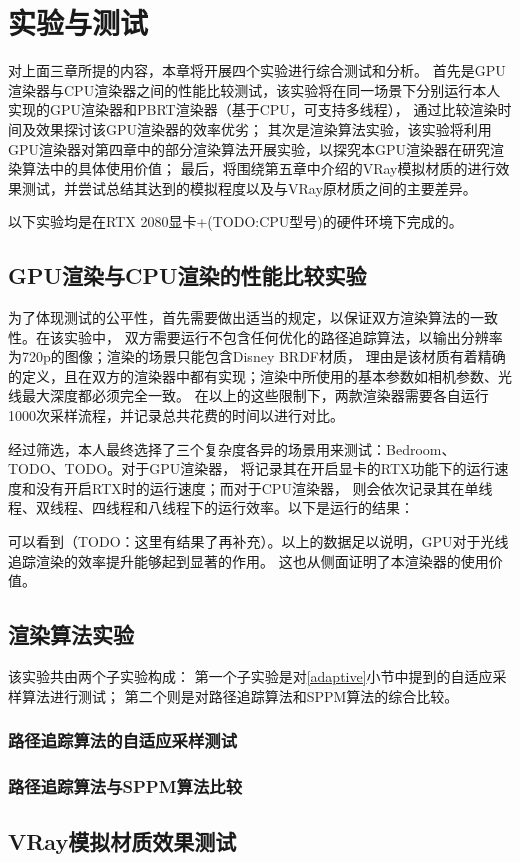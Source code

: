 \chapter{实验与测试}
\label{cha:evaluations}

对上面三章所提的内容，本章将开展四个实验进行综合测试和分析。
首先是GPU渲染器与CPU渲染器之间的性能比较测试，该实验将在同一场景下分别运行本人实现的GPU渲染器和PBRT渲染器（基于CPU，可支持多线程），
通过比较渲染时间及效果探讨该GPU渲染器的效率优劣；
其次是渲染算法实验，该实验将利用GPU渲染器对第四章中的部分渲染算法开展实验，以探究本GPU渲染器在研究渲染算法中的具体使用价值；
最后，将围绕第五章中介绍的VRay模拟材质的进行效果测试，并尝试总结其达到的模拟程度以及与VRay原材质之间的主要差异。

以下实验均是在RTX 2080显卡+(TODO:CPU型号)的硬件环境下完成的。

\section{GPU渲染与CPU渲染的性能比较实验}

为了体现测试的公平性，首先需要做出适当的规定，以保证双方渲染算法的一致性。在该实验中，
双方需要运行不包含任何优化的路径追踪算法，以输出分辨率为720p的图像；渲染的场景只能包含Disney BRDF材质，
理由是该材质有着精确的定义，且在双方的渲染器中都有实现；渲染中所使用的基本参数如相机参数、光线最大深度都必须完全一致。
在以上的这些限制下，两款渲染器需要各自运行1000次采样流程，并记录总共花费的时间以进行对比。

经过筛选，本人最终选择了三个复杂度各异的场景用来测试：Bedroom、TODO、TODO。对于GPU渲染器，
将记录其在开启显卡的RTX功能下的运行速度和没有开启RTX时的运行速度；而对于CPU渲染器，
则会依次记录其在单线程、双线程、四线程和八线程下的运行效率。以下是运行的结果：

可以看到（TODO：这里有结果了再补充）。以上的数据足以说明，GPU对于光线追踪渲染的效率提升能够起到显著的作用。
这也从侧面证明了本渲染器的使用价值。

\section{渲染算法实验}
该实验共由两个子实验构成：
第一个子实验是对\ref{adaptive}小节中提到的自适应采样算法进行测试；
第二个则是对路径追踪算法和SPPM算法的综合比较。

\subsection{路径追踪算法的自适应采样测试}


\subsection{路径追踪算法与SPPM算法比较}

\section{VRay模拟材质效果测试}